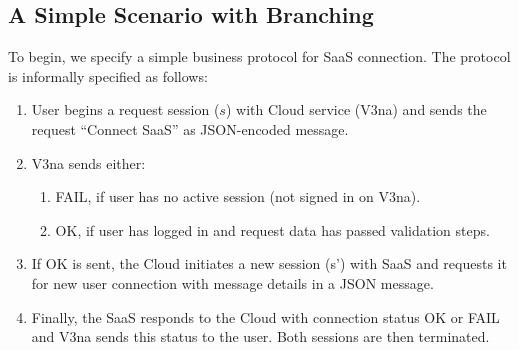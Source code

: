 \documentclass[10pt]{llncs}
\begin{document}
\subsection{A Simple Scenario with Branching}
To begin, we specify a simple business protocol for SaaS connection. The protocol is informally specified as follows:
\begin{enumerate}
\item  User begins a request session ($s$) with Cloud service (V3na) and sends the request ``Connect SaaS'' as JSON-encoded message.
\item  V3na sends either:
\begin{enumerate}
\item  FAIL, if user has no active session (not signed in on V3na). %
\item  OK, if user has logged in and request data has passed validation steps. %
\end{enumerate}
\item  If OK is sent, the Cloud initiates a new session (s') with SaaS and requests it for new user connection with message details in a JSON message.
\item Finally, the SaaS responds to the Cloud with connection status OK or FAIL and V3na sends this status to the user. Both sessions are then terminated.
\end{enumerate}
\end{document}
